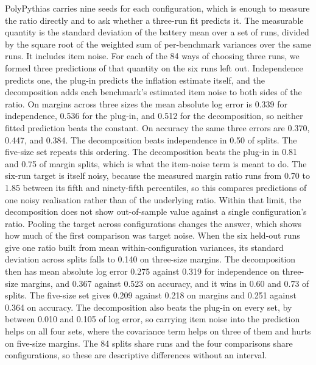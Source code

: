 PolyPythias carries nine seeds for each configuration, which is enough to measure the ratio directly and to ask whether a three-run fit predicts it. The measurable quantity is the standard deviation of the battery mean over a set of runs, divided by the square root of the weighted sum of per-benchmark variances over the same runs. It includes item noise. For each of the 84 ways of choosing three runs, we formed three predictions of that quantity on the six runs left out. Independence predicts one, the plug-in predicts the inflation estimate itself, and the decomposition adds each benchmark's estimated item noise to both sides of the ratio. On margins across three sizes the mean absolute log error is 0.339 for independence, 0.536 for the plug-in, and 0.512 for the decomposition, so neither fitted prediction beats the constant. On accuracy the same three errors are 0.370, 0.447, and 0.384. The decomposition beats independence in 0.50 of splits. The five-size set repeats this ordering. The decomposition beats the plug-in in 0.81 and 0.75 of margin splits, which is what the item-noise term is meant to do. The six-run target is itself noisy, because the measured margin ratio runs from 0.70 to 1.85 between its fifth and ninety-fifth percentiles, so this compares predictions of one noisy realisation rather than of the underlying ratio. Within that limit, the decomposition does not show out-of-sample value against a single configuration's ratio. Pooling the target across configurations changes the answer, which shows how much of the first comparison was target noise. When the six held-out runs give one ratio built from mean within-configuration variances, its standard deviation across splits falls to 0.140 on three-size margins. The decomposition then has mean absolute log error 0.275 against 0.319 for independence on three-size margins, and 0.367 against 0.523 on accuracy, and it wins in 0.60 and 0.73 of splits. The five-size set gives 0.209 against 0.218 on margins and 0.251 against 0.364 on accuracy. The decomposition also beats the plug-in on every set, by between 0.010 and 0.105 of log error, so carrying item noise into the prediction helps on all four sets, where the covariance term helps on three of them and hurts on five-size margins. The 84 splits share runs and the four comparisons share configurations, so these are descriptive differences without an interval.

